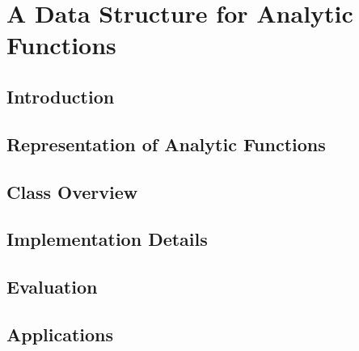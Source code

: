 \section{A Data Structure for Analytic Functions}
	\subsection{Introduction}
	\subsection{Representation of Analytic Functions}
	\subsection{Class Overview}
	\subsection{Implementation Details}
	\subsection{Evaluation}
	\subsection{Applications}